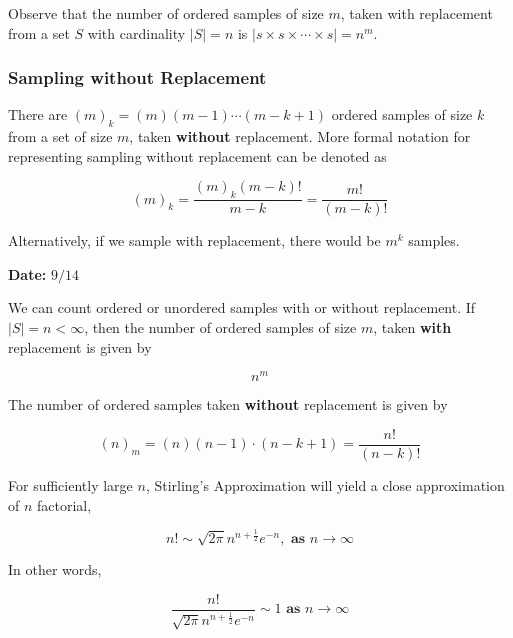 \documentclass[12pt]{article}
\begin{document}
\noindent
Observe that the number of ordered samples of size $m$, taken with replacement from a set $S$ with cardinality $\lvert S \rvert = n$ is $\lvert s \times s \times \cdots \times s \rvert = n^m$.

\subsubsection*{Sampling without Replacement}
\noindent
There are $(m)_k = (m)(m-1) \cdots (m-k+1)$ ordered samples of size $k$ from a set of size $m$, taken \textbf{without} replacement. More formal notation for representing sampling without replacement can be denoted as

\begin{equation*}
(m)_k = \frac{(m)_k (m-k)!}{m-k} = \frac{m!}{(m-k)!}
\end{equation*}

\noindent
Alternatively, if we sample with replacement, there would be $m^k$ samples.

\begin{flushright}
\textbf{Date:} $9/14$
\end{flushright}

\noindent
We can count ordered or unordered samples with or without replacement. If $\lvert S \rvert = n < \infty$, then the number of ordered samples of size $m$, taken \textbf{with} replacement is given by

\begin{equation*}
n^m
\end{equation*}

\noindent
The number of ordered samples taken \textbf{without} replacement is given by

\begin{equation*}
(n)_m = (n)(n-1) \cdot (n-k+1) = \frac{n!}{(n-k)!}
\end{equation*}

\noindent
For sufficiently large $n$, Stirling's Approximation will yield a close approximation of $n$ factorial,

\begin{equation*}
n! \sim \sqrt{2 \pi} n^{n + \frac{1}{2}} e^{-n}, \textbf{ as } n \rightarrow \infty
\end{equation*}

\noindent
In other words,

\begin{equation*}
\frac{n!}{\sqrt{2 \pi} n^{n + \frac{1}{2}} e^{-n}} \sim 1 \textbf{ as } n \rightarrow \infty
\end{equation*}
\end{document}
